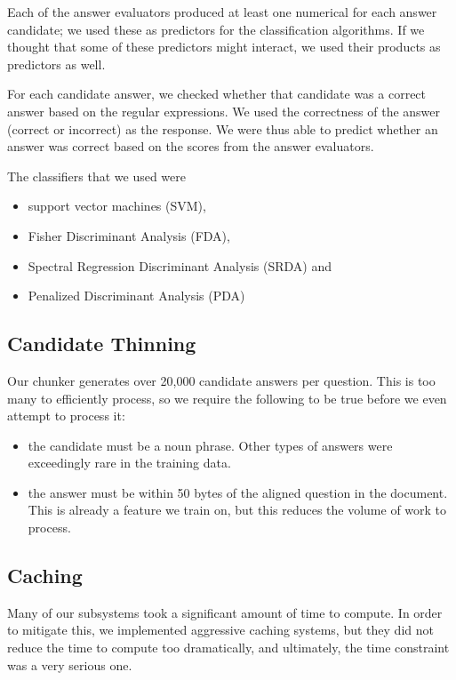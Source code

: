 \documentclass{article}
\begin{document}
Each of the answer evaluators produced at least one numerical for each answer
candidate; we used these as predictors for the classification algorithms.
If we thought that some of these predictors might interact, we used their products
as predictors as well.

For each candidate answer, we checked whether that candidate was a correct answer based on
the regular expressions. We used the correctness of the answer (correct or incorrect)
as the response. We were thus able to predict whether an answer was correct
based on the scores from the answer evaluators.

The classifiers that we used were
\begin{itemize}
\item support vector machines (SVM),
\item Fisher Discriminant Analysis (FDA),
\item Spectral Regression Discriminant Analysis (SRDA) and
\item Penalized Discriminant Analysis (PDA)
\end{itemize}

\subsection{Candidate Thinning}

Our chunker generates over 20,000 candidate answers per question.  This is too
many to efficiently process, so we require the following to be true before we
even attempt to process it:
\begin{itemize}
\item the candidate must be a noun phrase.  Other types of answers were
exceedingly rare in the training data.
\item the answer must be within 50 bytes of the aligned question in the
document.  This is already a feature we train on, but this reduces the volume of
work to process.
\end{itemize}

\subsection{Caching}

Many of our subsystems took a significant amount of time to compute.  In order
to mitigate this, we implemented aggressive caching systems, but they did not
reduce the time to compute too dramatically, and ultimately, the time constraint
was a very serious one.
\end{document}
